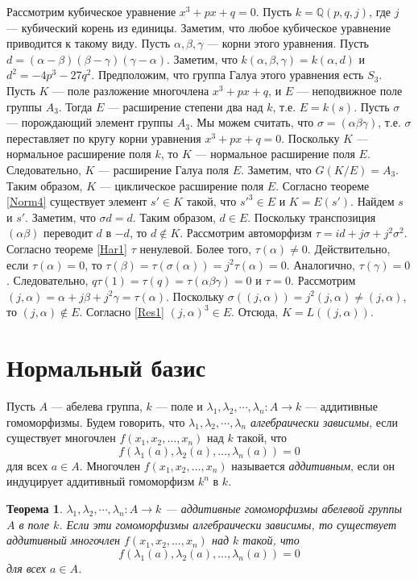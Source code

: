 \documentclass[12pt, titlepage, oneside]{amsbook}
\newcommand{\QQ}{\mathbb{Q}}
\newtheorem{theorem}{Теорема}[chapter]
\theoremstyle{definition}
\theoremstyle{remark}
\begin{document}
Рассмотрим кубическое уравнение $x^3+px+q=0$. Пусть $k=\QQ(p,q,j)$, где $j$ --- кубический корень из единицы. Заметим, что любое кубическое уравнение приводится к такому виду. Пусть $\alpha,\beta,\gamma$ --- корни этого уравнения. Пусть $d=(\alpha-\beta)(\beta-\gamma)(\gamma-\alpha)$. Заметим, что $k(\alpha,\beta,\gamma)=k(\alpha,d)$ и $d^2=-4p^3-27q^2$. Предположим, что группа Галуа этого уравнения есть $S_3$. Пусть $K$ --- поле разложение многочлена $x^3+px+q$, и $E$ --- неподвижное поле группы $A_3$. Тогда $E$ --- расширение степени два над $k$, т.е. $E=k(s)$. Пусть $\sigma$ --- порождающий элемент группы $A_3$. Мы можем считать, что $\sigma=(\alpha\beta\gamma)$, т.е. $\sigma$ переставляет по кругу корни уравнения $x^3+px+q=0$. Поскольку $K$ --- нормальное расширение поля $k$, то $K$ --- нормальное расширение поля $E$. Следовательно, $K$ --- расширение Галуа поля $E$. Заметим, что $G(K/E)=A_3$. Таким образом, $K$ --- циклическое расширение поля $E$. Согласно теореме \ref{Norm4} существует элемент $s'\in K$ такой, что $s'^3\in E$ и $K=E(s')$. Найдем $s$ и $s'$. Заметим, что $\sigma d=d$. Таким образом, $d\in E$. Поскольку транспозиция $(\alpha\beta)$ переводит $d$ в $-d$, то $d\not\in K$. Рассмотрим автоморфизм $\tau=id+j\sigma+j^2\sigma^2$. Согласно теореме \ref{Har1} $\tau$ ненулевой. Более того, $\tau(\alpha)\neq 0$. Действительно, если $\tau(\alpha)=0$, то $\tau(\beta)=\tau(\sigma(\alpha))=j^2\tau(\alpha)=0$. Аналогично, $\tau(\gamma)=0$. Следовательно, $q\tau(1)=\tau(q)=\tau(\alpha\beta\gamma)=0$ и $\tau=0$. Рассмотрим $(j,\alpha)=\alpha+j\beta+j^2\gamma=\tau(\alpha).$ Поскольку $\sigma((j,\alpha))=j^2(j,\alpha)\neq (j,\alpha)$, то $(j,\alpha)\not\in E$. Согласно \ref{Res1} $(j,\alpha)^3\in E$. Отсюда, $K=L((j,\alpha))$.

\section{Нормальный базис}

Пусть $A$ --- абелева группа, $k$ --- поле и $\lambda_1,\lambda_2,\cdots,\lambda_n\colon A\rightarrow k$ --- аддитивные гомоморфизмы. Будем говорить, что $\lambda_1,\lambda_2,\cdots,\lambda_n$ \emph{алгебраически зависимы}, если существует многочлен $f(x_1,x_2,\ldots,x_n)$ над $k$ такой, что $$f(\lambda_1(a),\lambda_2(a),\ldots,\lambda_n(a))=0$$ для всех $a\in A$.  Многочлен $f(x_1,x_2,\ldots,x_n)$ называется \emph{аддитивным}, если он индуцирует аддитивный гомоморфизм $k^n$ в $k$.

\begin{theorem}
\label{NormBas1}
$\lambda_1,\lambda_2,\cdots,\lambda_n\colon A\rightarrow k$ --- аддитивные гомоморфизмы абелевой группы $A$ в поле $k$. Если эти гомоморфизмы алгебраически зависимы, то существует аддитивный многочлен $f(x_1,x_2,\ldots,x_n)$ над $k$ такой, что $$f(\lambda_1(a),\lambda_2(a),\ldots,\lambda_n(a))=0$$ для всех $a\in A$.
\end{theorem}
\end{document}
